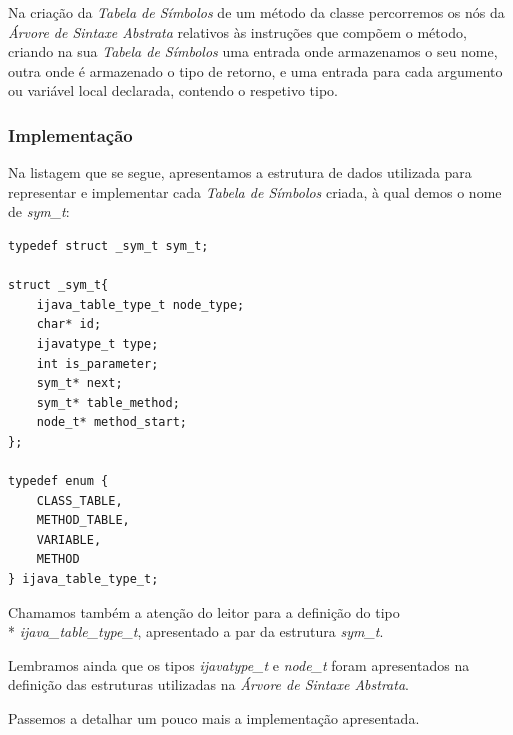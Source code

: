 \documentclass[11pt,a4paper]{article}
\begin{document}
	Na criação da \emph{Tabela de Símbolos} de um método da classe percorremos os nós da \emph{Árvore de Sintaxe Abstrata} relativos às instruções que compõem o método, criando na sua \emph{Tabela de Símbolos} uma entrada onde armazenamos o seu nome, outra onde é armazenado o tipo de retorno, e uma entrada para cada argumento ou variável local declarada, contendo o respetivo tipo.
	
	\subsubsection{Implementação}
	
	
	
	Na listagem que se segue, apresentamos a estrutura de dados utilizada para representar e implementar cada \emph{Tabela de Símbolos} criada, à qual demos o nome de \emph{sym\_t}:
	
	\begin{lstlisting}
typedef struct _sym_t sym_t;	

struct _sym_t{
	ijava_table_type_t node_type;
	char* id;
	ijavatype_t type;
	int is_parameter;
	sym_t* next;
	sym_t* table_method;
	node_t* method_start;
};

typedef enum {
	CLASS_TABLE,
	METHOD_TABLE,
	VARIABLE,
	METHOD
} ijava_table_type_t;
	\end{lstlisting}
	
	
	
	Chamamos também a atenção do leitor para a definição do tipo \\* \emph{ijava\_table\_type\_t}, apresentado a par da estrutura \emph{sym\_t}.
	
	Lembramos ainda que os tipos \emph{ijavatype\_t} e \emph{node\_t} foram apresentados na definição das estruturas utilizadas na \emph{Árvore de Sintaxe Abstrata}.
	
	Passemos a detalhar um pouco mais a implementação apresentada.
	
\end{document}
